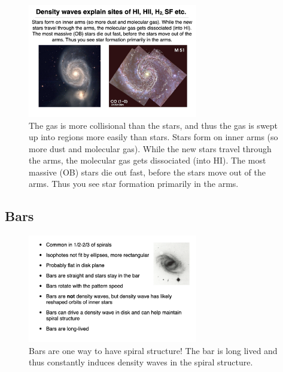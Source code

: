 \documentclass{article}
\begin{document}
\begin{figure}
    \centering
    \includegraphics[width=0.66\textwidth]{figs/Screen Shot 2021-10-27 at 10.35.42 AM.png}
    \caption{The gas is more collisional than the stars, and thus the gas is swept up into regions more easily than stars. Stars form on inner arms (so more dust and molecular gas). While the new stars travel through the arms, the molecular gas gets dissociated (into HI). The most massive (OB) stars die out fast, before the stars move out of the arms. Thus you see star formation primarily in the arms. }
    \label{fig:pre}
\end{figure}

\subsection{Bars}

\begin{figure}
    \centering
    \includegraphics[width=0.66\textwidth]{figs/Screen Shot 2021-10-27 at 10.36.54 AM.png}
    \caption{Bars are one way to have spiral structure! The bar is long lived and thus constantly induces density waves in the spiral structure. }
    \label{fig:bar}
\end{figure}
\end{document}
